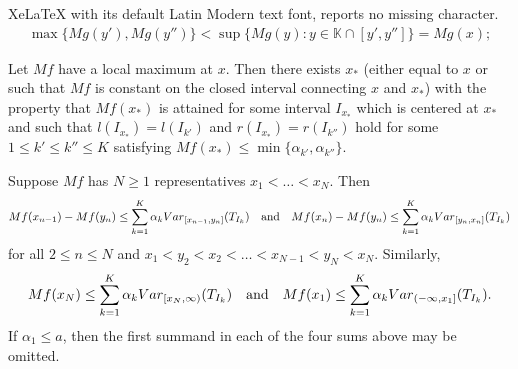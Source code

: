 \documentclass[10pt,a4paper]{amsart}
\newcommand{\KK}{\mathbb{K}}
\newcommand{\Var}{{\rm Var}}
\begin{document}
XeLaTeX with its default Latin Modern text font, reports no missing character.
	\begin{align} \label{max-def}
	\max\{Mg(y'), Mg(y'')\} < \sup\{ Mg(y) : y \in  \KK \cap [y',y'']  \}  = Mg(x);
	\end{align}

	\begin{lemma} \label{L2}
		Let $Mf$ have a local maximum at $x$. Then there exists $x_*$  (either equal to $x$ or such that $Mf$ is constant on the closed interval connecting $x$ and $x_*$) with the property that $Mf(x_*)$ is attained for some interval $I_{x_*}$ which is centered at $x_*$ and such that $l(I_{x_*}) = l(I_{k'})$ and $r(I_{x_*}) = r(I_{k''})$ hold for some $1\le k'\le k''\le K$ satisfying $Mf(x_*) \leq \min \{\alpha_{k'}, \alpha_{k''}\}$.
	\end{lemma} 

	\begin{lemma} \label{L3}
		Suppose $Mf$ has $N\ge1$ representatives $x_1 < \dots < x_N$.  
		Then
		\begin{align*}
		Mf(x_{n-1}) - Mf(y_{n}) \leq \sum_{k=1}^K \alpha_k \Var_{[x_{n-1},y_{n}]} (T_{I_k}) 
		\quad \text{and} \quad 
		Mf(x_n) - Mf(y_n) \leq \sum_{k=1}^K \alpha_k \Var_{[y_n, x_n]} (T_{I_k}) 
		\end{align*}
		for all $2\le n \le N$ and $x_1<y_2<x_2<\dots<x_{N-1}<y_N<x_N$. Similarly,
		\begin{align*}
		Mf(x_{N}) \leq \sum_{k=1}^K \alpha_k \Var_{[x_{N},\infty)} (T_{I_k}) 
		\quad \text{and} \quad 
		Mf(x_1) \leq \sum_{k=1}^K \alpha_k \Var_{(-\infty, x_1]} (T_{I_k}). 
		\end{align*}
		If $\alpha_1 \leq a$, then the first summand in each of the four sums above may be omitted.   
	\end{lemma}  
\end{document}
